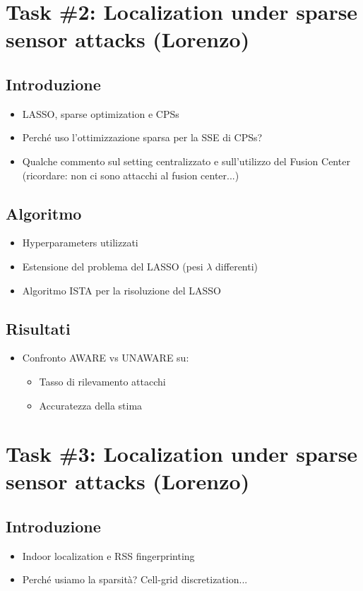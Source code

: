 \section*{Task \#2: Localization under sparse sensor attacks (Lorenzo)}
\subsection*{Introduzione}
\begin{itemize}
    \item LASSO, sparse optimization e CPSs
    \item Perch\'e uso l'ottimizzazione sparsa per la SSE di CPSs?
    \item Qualche commento sul setting centralizzato e sull'utilizzo del Fusion Center (ricordare: non ci sono attacchi al fusion center...)
\end{itemize}
\subsection*{Algoritmo}
\begin{itemize}
    \item Hyperparameters utilizzati
    \item Estensione del problema del LASSO (pesi $\lambda$ differenti)
    \item Algoritmo ISTA per la risoluzione del LASSO
\end{itemize}
\subsection*{Risultati}
\begin{itemize}
    \item Confronto AWARE vs UNAWARE su:
    \begin{itemize}
        \item Tasso di rilevamento attacchi
        \item Accuratezza della stima
    \end{itemize}
\end{itemize}

\section*{Task \#3: Localization under sparse sensor attacks (Lorenzo)}
\subsection*{Introduzione}
\begin{itemize}
    \item Indoor localization e RSS fingerprinting
    \item Perch\'e usiamo la sparsit\`a? Cell-grid discretization...
\end{itemize}
